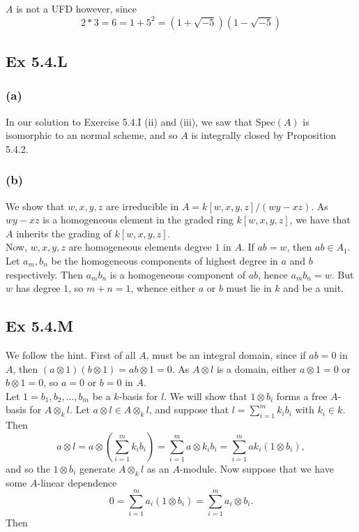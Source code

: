 \documentclass{article}
\theoremstyle{definition}
\newcommand{\Spec}{\text{Spec}}
\begin{document}
$A$ is not a UFD however, since
\[
	2 * 3 = 6 = 1 + 5^2 = (1 + \sqrt{-5})(1 - \sqrt{-5})
\]

\subsection*{Ex 5.4.L}

\subsubsection*{(a)}

In our solution to Exercise 5.4.I (ii) and (iii), we saw that $\Spec(A)$ is
isomorphic to an normal scheme, and so $A$ is integrally closed by Proposition
5.4.2.

\subsubsection*{(b)}

We show that $w,x,y,z$ are irreducible in $A = k[w,x,y,z]/(wy - xz)$. As $wy -
xz$ is a homogeneous element in the graded ring $k[w,x,y,z]$, we have that $A$
inherits the grading of $k[w,x,y,z]$. \\

Now, $w,x,y,z$ are homogeneous elements degree $1$ in $A$. If $ab = w$, then
$ab \in A_1$. Let $a_m, b_n$ be the homogeneous components of highest degree in
$a$ and $b$ respectively. Then $a_m b_n$ is a homogeneous component of $ab$,
hence $a_m b_n = w$. But $w$ has degree $1$, so $m + n = 1$, whence either $a$
or $b$ must lie in $k$ and be a unit. 

\subsection*{Ex 5.4.M}

We follow the hint. First of all $A$, must be an integral domain, since if $ab
= 0$ in $A$, then $(a \otimes 1)(b \otimes 1) = ab \otimes 1 = 0$. As $A
\otimes l$ is a domain, either $a \otimes 1 = 0$ or $b \otimes 1 = 0$, so $a =
0$ or $b = 0$ in $A$. \\

Let $1 = b_1, b_2, \ldots, b_m$ be a $k$-basis for $l$. We will show that $1
\otimes b_i$ forms a free $A$-basis for $A \otimes_{k} l$. Let $a \otimes l \in
A \otimes_{k} l$, and suppose that $l = \sum_{i = 1}^{m} k_i b_i$ with $k_i \in
k$. Then 
\[
	a \otimes l
	=
	a \otimes \left(\sum_{i = 1}^{m} k_i b_i\right)
	=
	\sum_{i = 1}^{m} a \otimes k_i b_i
	=
	\sum_{i = 1}^{m} a k_i (1 \otimes b_i),
\] 
and so the $1 \otimes b_i$ generate $A \otimes_{k} l$ as an $A$-module. Now
suppose that we have some $A$-linear dependence
\[
	0 
	= 
	\sum_{i = 1}^{m} a_i (1 \otimes b_i)
	=
	\sum_{i = 1}^{m} a_i \otimes b_i.
\] 
Then
\end{document}

